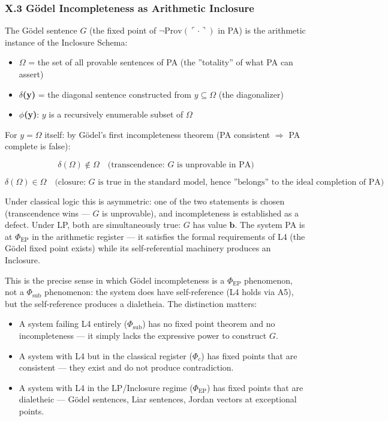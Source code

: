 \documentclass[12pt,a4paper]{article}
\begin{document}
\subsubsection{X.3 G\"odel Incompleteness as Arithmetic Inclosure}

The G\"odel sentence $G$ (the fixed point of $\neg\text{Prov}(\ulcorner \cdot \urcorner)$ in PA) is the arithmetic instance of the Inclosure Schema:

\begin{itemize}
    \item \textbf{$\Omega$} = the set of all provable sentences of PA (the ''totality'' of what PA can assert)
    \item \textbf{$\delta$(y)} = the diagonal sentence constructed from $y \subseteq \Omega$ (the diagonalizer)
    \item \textbf{$\phi$(y)}: $y$ is a recursively enumerable subset of $\Omega$
\end{itemize}

For $y = \Omega$ itself: by G\"odel's first incompleteness theorem (PA consistent $\Rightarrow$ PA complete is false):

\[\delta(\Omega) \notin \Omega \quad \text{(transcendence: }G\text{ is unprovable in PA)}\]

\[\delta(\Omega) \in \Omega \quad \text{(closure: }G\text{ is true in the standard model, hence ''belongs'' to the ideal completion of PA)}\]

Under classical logic this is asymmetric: one of the two statements is chosen (transcendence wins --- $G$ is unprovable), and incompleteness is established as a defect. Under LP, both are simultaneously true: $G$ has value $\mathbf{b}$. The system PA is at $\Phi_\text{EP}$ in the arithmetic register --- it satisfies the formal requirements of L4 (the G\"odel fixed point exists) while its self-referential machinery produces an Inclosure.

This is the precise sense in which G\"odel incompleteness is a $\Phi_\text{EP}$ phenomenon, not a $\Phi_\text{sub}$ phenomenon: the system does have self-reference (L4 holds via A5), but the self-reference produces a dialetheia. The distinction matters:

\begin{itemize}
    \item A system failing L4 entirely ($\Phi_\text{sub}$) has no fixed point theorem and no incompleteness --- it simply lacks the expressive power to construct $G$.
    \item A system with L4 but in the classical register ($\Phi_c$) has fixed points that are consistent --- they exist and do not produce contradiction.
    \item A system with L4 in the LP/Inclosure regime ($\Phi_\text{EP}$) has fixed points that are dialetheic --- G\"odel sentences, Liar sentences, Jordan vectors at exceptional points.
\end{itemize}
\end{document}
